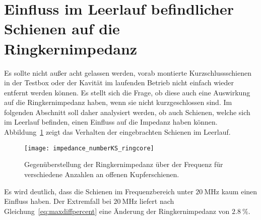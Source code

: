 \section{Einfluss im Leerlauf befindlicher Schienen auf die Ringkernimpedanz}
Es sollte nicht au\ss{}er acht gelassen werden, vorab montierte Kurzschlussschienen in der Testbox oder der Kavit\"at im laufenden Betrieb nicht einfach wieder entfernt werden k\"onnen. Es stellt sich die Frage, ob diese auch eine Auswirkung auf die Ringkernimpedanz haben, wenn sie nicht kurzgeschlossen sind. Im folgenden Abschnitt soll daher analysiert werden, ob auch Schienen, welche sich im Leerlauf befinden, einen Einfluss auf die Impedanz haben k\"onnen. Abbildung~\ref{fig:openksnumber} zeigt das Verhalten der eingebrachten Schienen im Leerlauf.
\begin{figure}[htb]
	\centering
	\texttt{[image: impedance\_numberKS\_ringcore]}
	\caption{Gegen\"uberstellung der Ringkernimpedanz \"uber der Frequenz f\"ur verschiedene Anzahlen an offenen Kupferschienen.}
	\label{fig:openksnumber}
\end{figure}
\par
Es wird deutlich, dass die Schienen im Frequenzbereich unter $\SI{20}{\mega\hertz}$ kaum einen Einfluss haben. Der Extremfall bei $\SI{20}{\mega\hertz}$ liefert nach Gleichung~\ref{eq:maxdiffpercent} eine \"Anderung der Ringkernimpedanz von $\SI{2,8}{\%}$. 